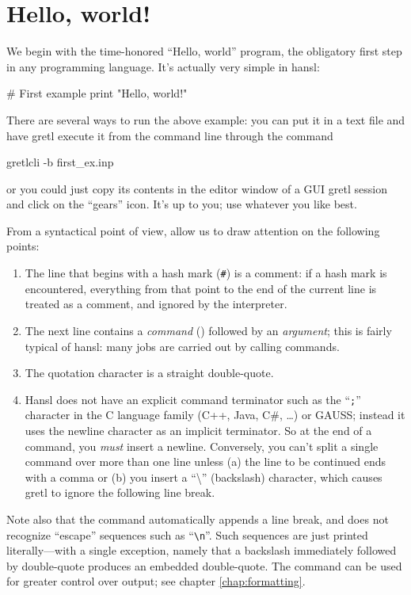 \chapter{Hello, world!}
\label{chap:hello}

We begin with the time-honored ``Hello, world'' program, the
obligatory first step in any programming language. It's actually very
simple in hansl:
\begin{code}
  # First example
  print "Hello, world!"
\end{code}

There are several ways to run the above example: you can put it in a
text file  and have gretl execute it from the
command line through the command
\begin{code}
  gretlcli -b first_ex.inp
\end{code}
or you could just copy its contents in the editor window of a GUI
gretl session and click on the ``gears'' icon. It's up to you; use
whatever you like best.

From a syntactical point of view, allow us to draw attention on
the following points:
\begin{enumerate}
\item The line that begins with a hash mark (\texttt{\#}) is a
  comment: if a hash mark is encountered, everything from that point
  to the end of the current line is treated as a comment, and ignored
  by the interpreter.
\item The next line contains a \emph{command} () followed
  by an \emph{argument}; this is fairly typical of hansl: many jobs
  are carried out by calling commands.
\item The quotation character is a straight double-quote.
\item Hansl does not have an explicit command terminator such as the
  ``\texttt{;}'' character in the C language family (C++, Java, C\#,
  \ldots) or GAUSS; instead it uses the newline character as an
  implicit terminator. So at the end of a command, you \emph{must}
  insert a newline. Conversely, you can't split a single command
  over more than one line unless (a) the line to be continued ends
  with a comma or (b) you insert a ``\textbackslash'' (backslash)
  character, which causes gretl to ignore the following line break.
\end{enumerate}

Note also that the  command automatically appends a line
break, and does not recognize ``escape'' sequences such as
``\verb|\n|''. Such sequences are just printed literally---with a
single exception, namely that a backslash immediately followed by
double-quote produces an embedded double-quote. The 
command can be used for greater control over output; see chapter
\ref{chap:formatting}.


